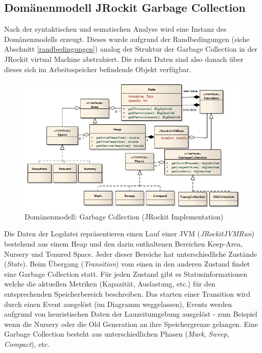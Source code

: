 \subsection{Domänenmodell JRockit Garbage Collection}\label{jrockit_domain_model}
Nach der syntaktischen und sematischen Analyse wird eine Instanz des Domänenmodells erzeugt. Dieses wurde aufgrund der Randbedingungen (siehe Abschnitt \ref{randbedingungen}) analog der Struktur der Garbage Collection in der JRockit virtual Machine abstrahiert. Die rohen Daten sind also danach über dieses sich im Arbeitsspeicher befindende Objekt verfügbar. \begin{landscape}
 \begin{figure}[H]
  	\centering
        	\includegraphics[width=18.2cm]{images/jrockit_extension_domain}
	\caption{Domänenmodell: Garbage Collection (JRockit Implementation)}
\end{figure}
\end{landscape}
Die Daten der Logdatei repräsentieren einen Lauf einer JVM (\textit{JRockitJVMRun}) bestehend aus einem Heap und den darin enthaltenen Bereichen Keep-Area, Nursery und Tenured Space. Jeder dieser Bereiche hat unterschiedliche Zustände (\textit{State}). Beim Übergang (\textit{Transition}) vom einen in den anderen Zustand findet eine Garbage Collection statt. Für jeden Zustand gibt es Statusinformationen welche die aktuellen Metriken (Kapazität, Auslastung, etc.) für den entsprechenden Speicherbereich beschreiben. Das starten einer Transition wird durch einen Event ausgelöst (im Diagramm weggelassen), Events werden aufgrund von heuristischen Daten der Lauzeitumgebung ausgelöst - zum Beispiel wenn die Nursery oder die Old Generation an ihre Speichergrenze gelangen. Eine Garbage Collection besteht aus unterschiedlichen Phasen (\textit{Mark}, \textit{Sweep}, \textit{Compact}), etc.

